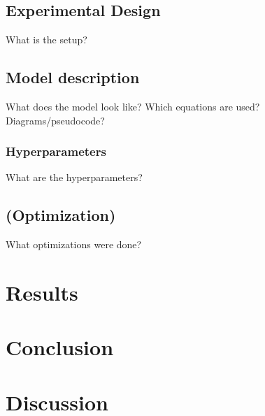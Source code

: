\documentclass[a4paper, 12pt]{report}
\begin{document}
\section{Experimental Design}
What is the setup?

\section{Model description}
What does the model look like? Which equations are used? Diagrams/pseudocode?

\subsection{Hyperparameters}
What are the hyperparameters?

\section{(Optimization)}
What optimizations were done?

\chapter{Results}


\chapter{Conclusion}


\chapter{Discussion}
\end{document}
